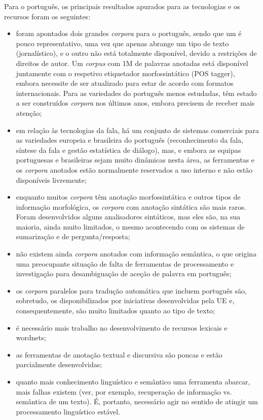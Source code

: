 \begin{multicols}{2}
Para o português, os principais resultados apurados para as tecnologias e os recursos foram os seguintes:

\begin{itemize}
 \item foram apontados dois grandes \textit{corpora} para o português, sendo que um é pouco representativo, uma vez que apenas abrange um tipo de texto (jornalístico), e o outro não está totalmente disponível, devido a restrições de direitos de autor. Um \textit{corpus} com 1M de palavras anotadas está disponível juntamente com o respetivo etiquetador morfossintático (POS tagger), embora necessite de ser atualizado para estar de acordo com formatos internacionais. Para as variedades do português menos estudadas, têm estado a ser construídos \textit{corpora} nos últimos anos, embora precisem de receber mais atenção;
   \item em relação às tecnologias da fala, há um conjunto de sistemas comerciais para as variedades europeia e brasileira do português (reconhecimento da fala, síntese da fala e gestão estatística de diálogo), mas, e embora as equipas portuguesas e brasileiras sejam muito dinâmicas nesta área, as ferramentas e os \textit{corpora} anotados estão normalmente reservados a uso interno e não estão disponíveis livremente;
   \item enquanto muitos \textit{corpora} têm anotação morfossintática e outros tipos de informação morfológica, os \textit{corpora} com anotação sintática são mais raros. Foram desenvolvidos alguns analisadores sintáticos, mas eles são, na sua maioria, ainda muito limitados, o mesmo acontecendo com os sistemas de sumarização e de pergunta/resposta;
   \item não existem ainda \textit{corpora} anotados com informação semântica, o que origina uma preocupante situação de falta de ferramentas de processamento e investigação para desambiguação de aceção de palavra em português; 
   \item os \textit{corpora} paralelos para tradução automática que incluem português são, sobretudo, os disponibilizados por iniciativas desenvolvidas pela UE e, consequentemente, são muito limitados quanto ao tipo de texto;
   \item é necessário mais trabalho no desenvolvimento de recursos lexicais e wordnets;
   \item as ferramentas de anotação textual e discursiva são poucas e estão parcialmente desenvolvidas;
   \item quanto mais conhecimento linguístico e semântico uma ferramenta abarcar, mais falhas existem (ver, por exemplo, recuperação de informação vs. semântica de um texto). É, portanto, necessário agir no sentido de atingir um processamento linguístico estável.
\end{itemize}


\end{multicols}
